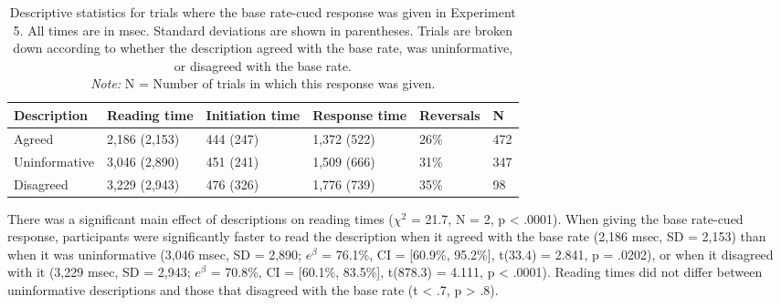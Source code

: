 \begin{table}[h]
  \centering
  \caption[Descriptive statistics for base rate-cued responses, Experiment 5.]{
    Descriptive statistics for trials where the base rate-cued response was given in Experiment 5.
    All times are in msec. Standard deviations are shown in parentheses.
    Trials are broken down according to whether the description
    agreed with the base rate, was uninformative,
    or disagreed with the base rate. \\
    \emph{Note:} N = Number of trials in which this response was given.
    \label{tbl:exp5_br_descriptives}
}
  \begin{tabular}{p{3cm} p{2.5cm} p{2.1cm} p{2.1cm} p{1.75cm} p{1.75cm} }
    \toprule
    Description   &  Reading time  & Initiation time & Response time & Reversals & N   \\
    \midrule
    Agreed        &  2,186 (2,153) & 444 (247)       & 1,372 (522)   & 26\%      & 472 \\
    Uninformative &  3,046 (2,890) & 451 (241)       & 1,509 (666)   & 31\%      & 347 \\
    Disagreed     &  3,229 (2,943) & 476 (326)       & 1,776 (739)   & 35\%      & 98  \\
    \bottomrule
  \end{tabular}
\end{table}



There was a significant main effect of
descriptions on reading times
($\chi^2$ = 21.7, N = 2, p < .0001).
When giving the base rate-cued response,
participants were significantly faster to read the description
when it agreed with the base rate (2,186 msec, SD = 2,153)
than when it was uninformative (3,046 msec, SD = 2,890;
$e^{\beta}$ = 76.1\%, CI = [60.9\%, 95.2\%],
t(33.4) = 2.841, p = .0202),
or when it disagreed with it (3,229 msec, SD = 2,943;
$e^{\beta}$ = 70.8\%, CI = [60.1\%, 83.5\%],
t(878.3) = 4.111, p < .0001).
Reading times did not differ between uninformative descriptions
and those that disagreed with the base rate (t < .7, p > .8).

